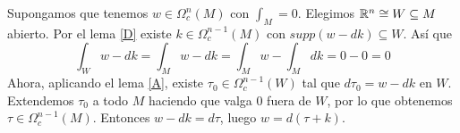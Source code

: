 \documentclass[CV.tex]{subfiles}
\begin{document}
\begin{dem}

Supongamos que tenemos $w\in\Omega^n_c(M)$ con $\int_M=0$. Elegimos $\mathbb{R}^n\cong W\subseteq M$ abierto. Por el lema \ref{D} existe $k\in\Omega_c^{n-1}(M)$ con $supp(w-dk)\subseteq W$. Así que
\[
\int_W w-dk=\int_M w-dk=\int_M w-\int_M dk=0-0=0
\]
Ahora, aplicando el lema \ref{A}, existe $\tau_0\in\Omega_c^{n-1}(W)$ tal que $d\tau_0=w-dk$ en $W$. Extendemos $\tau_0$ a todo $M$ haciendo que valga 0 fuera de $W$, por lo que obtenemos $\tau\in\Omega_c^{n-1}(M)$. Entonces $w-dk=d\tau$, luego $w=d(\tau+k)$. \QED
\end{dem}
\end{document}
